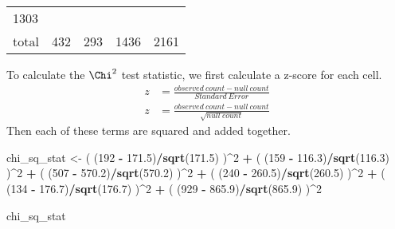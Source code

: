 \documentclass[]{article}
\newenvironment{Shaded}{\begin{snugshade}}{\end{snugshade}}
\newcommand{\DecValTok}[1]{\textcolor[rgb]{0.00,0.00,0.81}{#1}}
\newcommand{\FloatTok}[1]{\textcolor[rgb]{0.00,0.00,0.81}{#1}}
\newcommand{\KeywordTok}[1]{\textcolor[rgb]{0.13,0.29,0.53}{\textbf{#1}}}
\newcommand{\NormalTok}[1]{#1}
\newcommand{\OperatorTok}[1]{\textcolor[rgb]{0.81,0.36,0.00}{\textbf{#1}}}
\newcommand{\StringTok}[1]{\textcolor[rgb]{0.31,0.60,0.02}{#1}}
\begin{document}
\begin{longtable}[]{@{}lllll@{}}
\begin{minipage}[t]{0.17\columnwidth}
1303\strut
\end{minipage}\tabularnewline
\begin{minipage}[t]{0.17\columnwidth}\raggedright
total\strut
\end{minipage} & \begin{minipage}[t]{0.17\columnwidth}\raggedright
432\strut
\end{minipage} & \begin{minipage}[t]{0.17\columnwidth}\raggedright
293\strut
\end{minipage} & \begin{minipage}[t]{0.17\columnwidth}\raggedright
1436\strut
\end{minipage} & \begin{minipage}[t]{0.17\columnwidth}\raggedright
2161\strut
\end{minipage}\tabularnewline
\bottomrule
\end{longtable}

To calculate the \(\Chi^{2}\) test statistic, we first calculate a
z-score for each cell.\\
\[
\begin{aligned}
z & = \frac{observed~count - null~count}{Standard~Error} \\
z & = \frac{observed~count - null~count}{\sqrt{null~count}}
\end{aligned}
\] Then each of these terms are squared and added together.

\begin{Shaded}
\begin{Highlighting}[]
\NormalTok{chi_sq_stat <-}\StringTok{ }\NormalTok{( (}\DecValTok{192} \OperatorTok{-}\StringTok{ }\FloatTok{171.5}\NormalTok{)}\OperatorTok{/}\KeywordTok{sqrt}\NormalTok{(}\FloatTok{171.5}\NormalTok{) )}\OperatorTok{^}\DecValTok{2} \OperatorTok{+}\StringTok{ }
\StringTok{          }\NormalTok{( (}\DecValTok{159} \OperatorTok{-}\StringTok{ }\FloatTok{116.3}\NormalTok{)}\OperatorTok{/}\KeywordTok{sqrt}\NormalTok{(}\FloatTok{116.3}\NormalTok{) )}\OperatorTok{^}\DecValTok{2} \OperatorTok{+}\StringTok{ }
\StringTok{          }\NormalTok{( (}\DecValTok{507} \OperatorTok{-}\StringTok{ }\FloatTok{570.2}\NormalTok{)}\OperatorTok{/}\KeywordTok{sqrt}\NormalTok{(}\FloatTok{570.2}\NormalTok{) )}\OperatorTok{^}\DecValTok{2} \OperatorTok{+}\StringTok{ }
\StringTok{          }\NormalTok{( (}\DecValTok{240} \OperatorTok{-}\StringTok{ }\FloatTok{260.5}\NormalTok{)}\OperatorTok{/}\KeywordTok{sqrt}\NormalTok{(}\FloatTok{260.5}\NormalTok{) )}\OperatorTok{^}\DecValTok{2} \OperatorTok{+}\StringTok{ }
\StringTok{          }\NormalTok{( (}\DecValTok{134} \OperatorTok{-}\StringTok{ }\FloatTok{176.7}\NormalTok{)}\OperatorTok{/}\KeywordTok{sqrt}\NormalTok{(}\FloatTok{176.7}\NormalTok{) )}\OperatorTok{^}\DecValTok{2} \OperatorTok{+}\StringTok{ }
\StringTok{          }\NormalTok{( (}\DecValTok{929} \OperatorTok{-}\StringTok{ }\FloatTok{865.9}\NormalTok{)}\OperatorTok{/}\KeywordTok{sqrt}\NormalTok{(}\FloatTok{865.9}\NormalTok{) )}\OperatorTok{^}\DecValTok{2}

\NormalTok{chi_sq_stat}
\end{Highlighting}
\end{Shaded}
\end{document}
